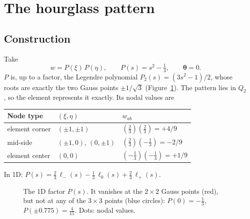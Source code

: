 \section{The hourglass pattern}

\subsection{Construction}
Take
\begin{equation}
  w = P(\xi)\,P(\eta), \qquad P(s) = s^2 - \tfrac13, \qquad \boldsymbol{\theta} = 0 .
\end{equation}
$P$ is, up to a factor, the Legendre polynomial $P_2(s) = (3s^2 - 1)/2$, whose roots
are exactly the two Gauss points $\pm 1/\sqrt{3}$ (Figure~\ref{fig:factor}). The
pattern lies in $Q_2$, so the element represents it exactly. Its nodal values are
\begin{center}
\begin{tabular}{|l|l|l|}
\hline
Node type & $(\xi, \eta)$ & $w_{ab}$ \\
\hline
element corner & $(\pm 1, \pm 1)$ & $(\tfrac23)(\tfrac23) = +4/9$ \\
mid-side & $(\pm 1, 0)$, $(0, \pm 1)$ & $(\tfrac23)(-\tfrac13) = -2/9$ \\
element center & $(0, 0)$ & $(-\tfrac13)(-\tfrac13) = +1/9$ \\
\hline
\end{tabular}
\end{center}
In 1D: $P(s) = \tfrac23\,\ell_-(s) - \tfrac13\,\ell_0(s) + \tfrac23\,\ell_+(s)$.

\begin{figure}[htbp]
\centering
{}
\caption{The 1D factor $P(s)$. It vanishes at the $2\times 2$ Gauss points (red),
but not at any of the $3\times 3$ points (blue circles): $P(0) = -\frac13$,
$P(\pm 0.775) = \frac{4}{15}$. Dots: nodal values.}
\label{fig:factor}
\end{figure}

